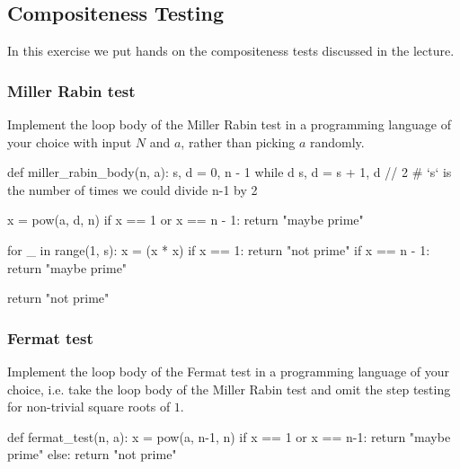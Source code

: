\documentclass{article}
\begin{document}
  \subsection{Compositeness Testing}
  \begin{centerframebox}
    In this exercise we put hands on the compositeness tests discussed in the lecture.
  \end{centerframebox}
  \subsubsection{Miller Rabin test}
  \begin{centerframebox}
    Implement the loop body of the Miller Rabin test in a programming
    language of your choice with input $N$ and $a$, rather than picking $a$
    randomly.
  \end{centerframebox}
  \begin{mylisting}
    def miller_rabin_body(n, a):
      s, d = 0, n - 1
      while d %
        s, d = s + 1, d // 2
      # `s` is the number of times we could divide n-1 by 2

      x = pow(a, d, n)
      if x == 1 or x == n - 1:
        return "maybe prime"

      for _ in range(1, s):
        x = (x * x) %
        if x == 1:
          return "not prime"
        if x == n - 1:
          return "maybe prime"

      return "not prime"
  \end{mylisting}
  \subsubsection{Fermat test}
  \begin{centerframebox}
    Implement the loop body of the Fermat test in a programming language of your choice, i.e. take the loop body of the Miller Rabin test
    and omit the step testing for non-trivial square roots of $1$.
  \end{centerframebox}
  \begin{mylisting}
    def fermat_test(n, a):
      x = pow(a, n-1, n)
      if x == 1 or x == n-1:
        return "maybe prime"
      else:
        return "not prime"
  \end{mylisting}
\end{document}
